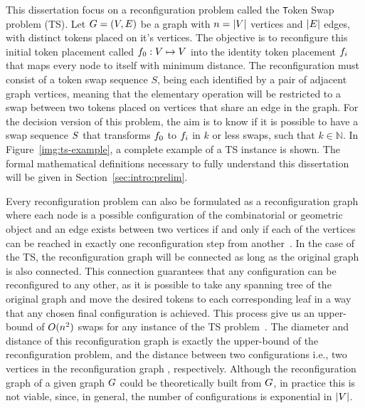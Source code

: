 \documentclass[msc]{ppgccufmg}    %
\begin{document}

This dissertation focus on a reconfiguration problem called the {\texttt Token
Swap} problem (TS).
Let $G = (V,E)$ be a graph with $n = |V|$ 
vertices and $|E|$ edges, with distinct tokens placed on it's 
vertices. 
The objective is to reconfigure this initial token placement called  
$f_{0} : V \mapsto V$ into the identity token 
placement $f_{i}$ that maps every node to itself with minimum distance. 
The reconfiguration must consist of a token swap sequence $S$, being each 
identified by a pair of adjacent graph vertices, meaning that the elementary
operation will be restricted to a swap between two tokens placed on vertices 
that share an edge in the graph.
For the decision version of this problem, the aim is to know if it is possible 
to have a swap sequence $S$ that transforms $f_{0}$ to $f_{i}$ in $k$ 
or less swaps, such that $k \in \mathbb{N}$.
In Figure~\ref{img:ts-example}, a complete example of a TS instance is shown.
The formal mathematical definitions necessary to fully understand this dissertation 
will be given in Section~\ref{sec:intro:prelim}.


Every reconfiguration problem can also be formulated as a reconfiguration 
graph where each node is a possible configuration of the combinatorial
or geometric object and an edge exists between two vertices if and only if 
each of the vertices can be reached in exactly one reconfiguration step from
another~\citep{Naomi:2018}.
In the case of the TS, the reconfiguration graph will be connected as long as
the original graph is also connected.
This connection guarantees that any configuration can be reconfigured to any 
other, as it is possible to take any spanning tree of the original graph and 
move the desired tokens to each corresponding leaf in a way that any chosen 
final configuration is achieved.
This process give us an upper-bound of $O(n^{2})$ 
swaps for any instance of the TS problem~\citep{Yamanaka:2015}.
The diameter and distance of this reconfiguration graph is exactly the 
upper-bound of the reconfiguration problem, and the distance between two 
configurations \textemdash i.e., two vertices in the 
reconfiguration graph \textemdash, respectively.
Although the reconfiguration graph of a given graph $G$ could be 
theoretically built from $G$, in practice this is not viable, since, in 
general, the number of configurations is exponential in $|V|$.
\end{document}

